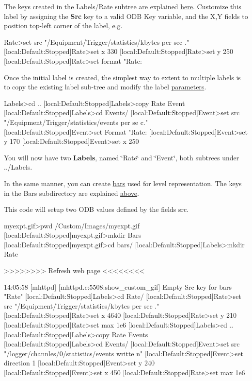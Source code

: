 The keys created in the Labels/Rate subtree are explained \hyperlink{RC_mhttpd_Image_access_RC_mhttpd_labels_tree}{here}. Customize this label by assigning the {\bfseries Src} key to a valid ODB Key variable, and the X,Y fields to position top-\/left corner of the label, e.g. 
\begin{DoxyCode}
Rate>set src "/Equipment/Trigger/statistics/kbytes per sec
      ."
[local:Default:Stopped]Rate>set x 330
[local:Default:Stopped]Rate>set y 250 
[local:Default:Stopped]Rate>set format "Rate:%
\end{DoxyCode}


Once the initial label is created, the simplest way to extent to multiple labels is to copy the existing label sub-\/tree and modify the label \hyperlink{structparameters}{parameters}. 
\begin{DoxyCode}
Labels>cd .. 
[local:Default:Stopped]Labels>copy Rate Event
[local:Default:Stopped]Labels>cd Events/
[local:Default:Stopped]Event>set src "/Equipment/Trigger/statistics/events per se
      c."
[local:Default:Stopped]Event>set Format "Rate:%
[local:Default:Stopped]Event>set y 170
[local:Default:Stopped]Event>set x 250
\end{DoxyCode}
 You will now have two {\bfseries Labels}, named \char`\"{}Rate\char`\"{} and \char`\"{}Event\char`\"{}, both subtrees under ../Labels.

In the same manner, you can create \hyperlink{RC_mhttpd_Image_access_RC_mhttpd_custom_bars}{bars} used for level representation. The keys in the Bars subdirectory are explained \hyperlink{RC_mhttpd_Image_access_RC_mhttpd_bars_tree}{above}.

This code will setup two ODB values defined by the fields src. 
\begin{DoxyCode}
myexpt.gif>pwd
/Custom/Images/myexpt.gif
[local:Default:Stopped]myexpt.gif>mkdir Bars
[local:Default:Stopped]myexpt.gif>cd bars/
[local:Default:Stopped]Labels>mkdir Rate

>>>>>>>> Refresh web page <<<<<<<<

14:05:58 [mhttpd] [mhttpd.c:5508:show_custom_gif] Empty Src key for bars "Rate"
[local:Default:Stopped]Labels>cd Rate/
[local:Default:Stopped]Rate>set src "/Equipment/Trigger/statistics/kbytes per sec
      ."
[local:Default:Stopped]Rate>set x 4640
[local:Default:Stopped]Rate>set y 210 
[local:Default:Stopped]Rate>set max 1e6 
[local:Default:Stopped]Labels>cd .. 
[local:Default:Stopped]Labels>copy Rate Events
[local:Default:Stopped]Labels>cd Events/
[local:Default:Stopped]Event>set src "/logger/channles/0/statistics/events writte
      n"
[local:Default:Stopped]Event>set direction 1
[local:Default:Stopped]Event>set y 240
[local:Default:Stopped]Event>set x 450
[local:Default:Stopped]Rate>set max 1e6 
\end{DoxyCode}



